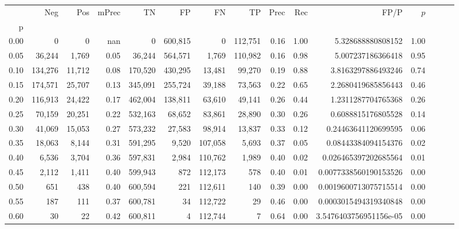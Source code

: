 \begin{tabular}{rrrrrrrrrrrrrrr}
\toprule
{} &      Neg &     Pos & mPrec &       TN &       FP &       FN &       TP &  Prec &   Rec &                    FP/P & $\hat{p}$ \\
p    &          &         &       &          &          &          &          &       &       &                         &           \\
\midrule
0.00 &        0 &       0 &   nan &        0 &  600,815 &        0 &  112,751 &  0.16 &  1.00 &       5.328688880808152 &      1.00 \\
0.05 &   36,244 &   1,769 &  0.05 &   36,244 &  564,571 &    1,769 &  110,982 &  0.16 &  0.98 &       5.007237186366418 &      0.95 \\
0.10 &  134,276 &  11,712 &  0.08 &  170,520 &  430,295 &   13,481 &   99,270 &  0.19 &  0.88 &      3.8163297886493246 &      0.74 \\
0.15 &  174,571 &  25,707 &  0.13 &  345,091 &  255,724 &   39,188 &   73,563 &  0.22 &  0.65 &      2.2680419685856443 &      0.46 \\
0.20 &  116,913 &  24,422 &  0.17 &  462,004 &  138,811 &   63,610 &   49,141 &  0.26 &  0.44 &      1.2311287704765368 &      0.26 \\
0.25 &   70,159 &  20,251 &  0.22 &  532,163 &   68,652 &   83,861 &   28,890 &  0.30 &  0.26 &      0.6088815176805528 &      0.14 \\
0.30 &   41,069 &  15,053 &  0.27 &  573,232 &   27,583 &   98,914 &   13,837 &  0.33 &  0.12 &     0.24463641120699595 &      0.06 \\
0.35 &   18,063 &   8,144 &  0.31 &  591,295 &    9,520 &  107,058 &    5,693 &  0.37 &  0.05 &     0.08443384094154376 &      0.02 \\
0.40 &    6,536 &   3,704 &  0.36 &  597,831 &    2,984 &  110,762 &    1,989 &  0.40 &  0.02 &    0.026465397202685564 &      0.01 \\
0.45 &    2,112 &   1,411 &  0.40 &  599,943 &      872 &  112,173 &      578 &  0.40 &  0.01 &   0.0077338560190153526 &      0.00 \\
0.50 &      651 &     438 &  0.40 &  600,594 &      221 &  112,611 &      140 &  0.39 &  0.00 &   0.0019600713075715514 &      0.00 \\
0.55 &      187 &     111 &  0.37 &  600,781 &       34 &  112,722 &       29 &  0.46 &  0.00 &   0.0003015494319340848 &      0.00 \\
0.60 &       30 &      22 &  0.42 &  600,811 &        4 &  112,744 &        7 &  0.64 &  0.00 &  3.5476403756951156e-05 &      0.00 \\

\end{tabular}
